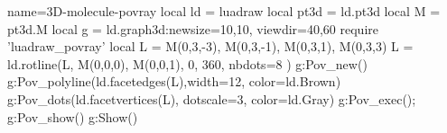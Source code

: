 \documentclass[border=5pt]{standalone}%
\begin{document}
\begin{luadraw}{name=3D-molecule-povray}
local ld = luadraw
local pt3d = ld.pt3d
local M = pt3d.M
local g = ld.graph3d:new{size={10,10}, viewdir={40,60}}
require 'luadraw_povray'
local L = {M(0,3,-3), M(0,3,-1), M(0,3,1), M(0,3,3)}
L = ld.rotline(L, {M(0,0,0), M(0,0,1)}, 0, 360, {nbdots=8} )
g:Pov_new()
g:Pov_polyline(ld.facetedges(L),{width=12, color=ld.Brown})
g:Pov_dots(ld.facetvertices(L), {dotscale=3, color=ld.Gray})
g:Pov_exec(); g:Pov_show()
g:Show() 
\end{luadraw}
\end{document}
